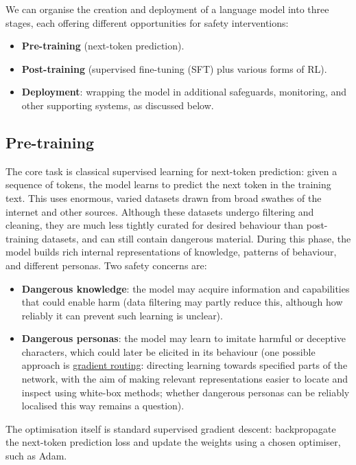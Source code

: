 We can organise the creation and deployment of a language model into three stages, each offering different opportunities for safety interventions:
\begin{itemize}
  \item \textbf{Pre-training} (next-token prediction).
  \item \textbf{Post-training} (supervised fine-tuning (SFT) plus various forms of RL).
  \item \textbf{Deployment}: wrapping the model in additional safeguards, monitoring, and other supporting systems, as discussed below.
\end{itemize}

\subsection{Pre-training}

The core task is classical supervised learning for next-token prediction: given a sequence of tokens, the model learns to predict the next token in the training text. This uses enormous, varied datasets drawn from broad swathes of the internet and other sources. Although these datasets undergo filtering and cleaning, they are much less tightly curated for desired behaviour than post-training datasets, and can still contain dangerous material. During this phase, the model builds rich internal representations of knowledge, patterns of behaviour, and different personas. Two safety concerns are:
\begin{itemize}
  \item \textbf{Dangerous knowledge}: the model may acquire information and capabilities that could enable harm (data filtering may partly reduce this, although how reliably it can prevent such learning is unclear).
  \item \textbf{Dangerous personas}: the model may learn to imitate harmful or deceptive characters, which could later be elicited in its behaviour (one possible approach is \href{https://arxiv.org/abs/2410.04332}{gradient routing}: directing learning towards specified parts of the network, with the aim of making relevant representations easier to locate and inspect using white-box methods; whether dangerous personas can be reliably localised this way remains a question).
\end{itemize}

The optimisation itself is standard supervised gradient descent: backpropagate the next-token prediction loss and update the weights using a chosen optimiser, such as Adam.

